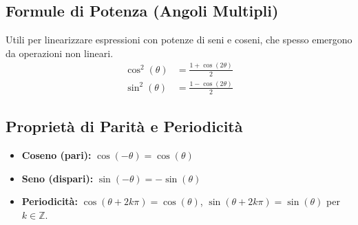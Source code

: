 \subsection{Formule di Potenza (Angoli Multipli)}
Utili per linearizzare espressioni con potenze di seni e coseni, che spesso emergono da operazioni non lineari.
\begin{align*}
    \cos^2(\theta) &= \frac{1 + \cos(2\theta)}{2} \\
    \sin^2(\theta) &= \frac{1 - \cos(2\theta)}{2}
\end{align*}

\subsection{Proprietà di Parità e Periodicità}
\begin{itemize}
    \item \textbf{Coseno (pari):} $\cos(-\theta) = \cos(\theta)$
    \item \textbf{Seno (dispari):} $\sin(-\theta) = -\sin(\theta)$
    \item \textbf{Periodicità:} $\cos(\theta + 2k\pi) = \cos(\theta)$, $\sin(\theta + 2k\pi) = \sin(\theta)$ per $k \in \mathbb{Z}$.
\end{itemize}